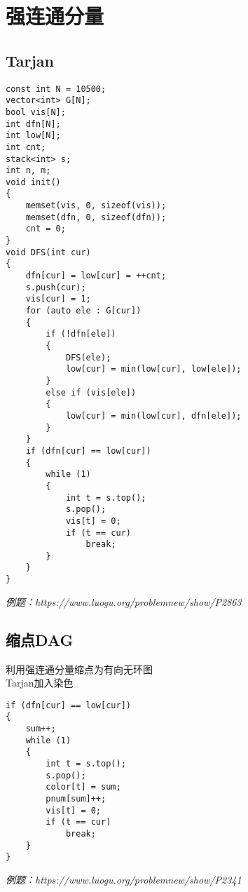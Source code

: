 \section{强连通分量}
\subsection{Tarjan}
\begin{lstlisting}
const int N = 10500;
vector<int> G[N];
bool vis[N];
int dfn[N];
int low[N];
int cnt;
stack<int> s;
int n, m;
void init()
{
    memset(vis, 0, sizeof(vis));
    memset(dfn, 0, sizeof(dfn));
    cnt = 0;
}
void DFS(int cur)
{
    dfn[cur] = low[cur] = ++cnt;
    s.push(cur);
    vis[cur] = 1;
    for (auto ele : G[cur])
    {
        if (!dfn[ele])
        {
            DFS(ele);
            low[cur] = min(low[cur], low[ele]);
        }
        else if (vis[ele])
        {
            low[cur] = min(low[cur], dfn[ele]);
        }
    }
    if (dfn[cur] == low[cur])
    {
        while (1)
        {
            int t = s.top();
            s.pop();
            vis[t] = 0;
            if (t == cur)
                break;
        }
    }
}
\end{lstlisting}
\emph{例题：https://www.luogu.org/problemnew/show/P2863}

\subsection{缩点DAG}
利用强连通分量缩点为有向无环图\\
Tarjan加入染色
\begin{lstlisting}
if (dfn[cur] == low[cur])
{
    sum++;
    while (1)
    {
        int t = s.top();
        s.pop();
        color[t] = sum;
        pnum[sum]++;
        vis[t] = 0;
        if (t == cur)
            break;
    }
}
\end{lstlisting}
\emph{例题：https://www.luogu.org/problemnew/show/P2341}